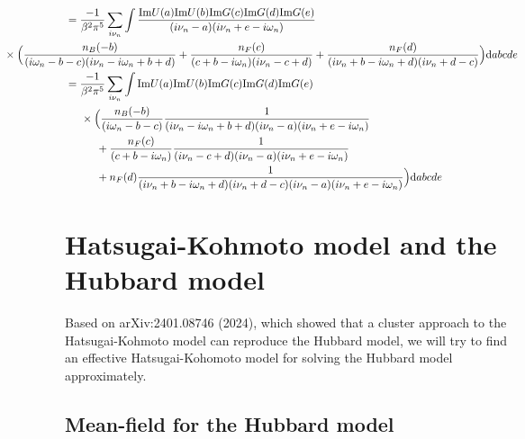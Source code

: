\documentclass[12pt,a4paper]{scrartcl}
\numberwithin{equation}{section}
\begin{document}
\begin{align}
 &= \frac{-1}{\beta^2\pi^5}\sum_{i\nu_n} 
       \int \frac{ \mathrm{Im}U(a)\mathrm{Im}U(b)\mathrm{Im}G(c)\mathrm{Im}G(d)\mathrm{Im}G(e) }
                 { (i\nu_n-a)(i\nu_n+e-i\omega_n) } \nonumber \\
&\hspace*{-2cm}  \times\Big( 
                    \frac{n_B(-b)}{(i\omega_n-b-c)(i\nu_n-i\omega_n+b+d)}
                   +\frac{n_F(c)}{(c+b-i\omega_n)(i\nu_n-c+d)} 
                   +\frac{n_F(d)}{(i\nu_n+b-i\omega_n+d)(i\nu_n+d-c)}
                 \Big)\mathrm{d}abcde \\
%
 &= \frac{-1}{\beta^2\pi^5}\sum_{i\nu_n} 
       \int \mathrm{Im}U(a)\mathrm{Im}U(b)\mathrm{Im}G(c)\mathrm{Im}G(d)\mathrm{Im}G(e) \nonumber \\
&\hspace*{0.5cm}  \times\Big( 
                    \frac{n_B(-b)}{(i\omega_n-b-c)}
                    \frac{1}{(i\nu_n-i\omega_n+b+d)(i\nu_n-a)(i\nu_n+e-i\omega_n)}\nonumber \\
&\hspace*{1cm} 
                   +\frac{n_F(c)}{(c+b-i\omega_n)} 
                   \frac{1}{(i\nu_n-c+d)(i\nu_n-a)(i\nu_n+e-i\omega_n)}\nonumber \\
&\hspace*{1cm} 
                   +n_F(d)
                   \frac{1}{(i\nu_n+b-i\omega_n+d)(i\nu_n+d-c)(i\nu_n-a)(i\nu_n+e-i\omega_n)}
                 \Big)\mathrm{d}abcde
\end{align}

\clearpage


\section{Hatsugai-Kohmoto model and the Hubbard model}
Based on arXiv:2401.08746 (2024), which showed that a cluster approach 
to the Hatsugai-Kohmoto model can reproduce the Hubbard model, we will
try to find an effective Hatsugai-Kohomoto model for solving the 
Hubbard model approximately.

\subsection{Mean-field for the Hubbard model}
\end{document}
